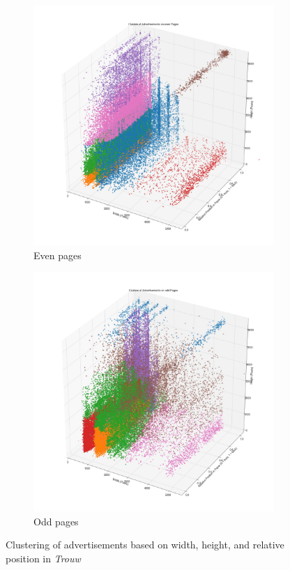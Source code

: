 \documentclass[USenglish]{article}
\begin{document}
\begin{figure}
  \centering
  \begin{subfigure}[b]{0.8\textwidth}
    \includegraphics[width=\textwidth]{figures/even_sizes}
    \caption{Even pages}
    \label{fig:clustera}
  \end{subfigure}
  \begin{subfigure}[b]{0.8\textwidth}
    \includegraphics[width=\textwidth]{figures/odd_sizes}
    \caption{Odd pages}
    \label{fig:clusterb}
  \end{subfigure}
  \caption{Clustering of advertisements based on width, height, and relative position in \textit{Trouw}}
\end{figure}
\end{document}
